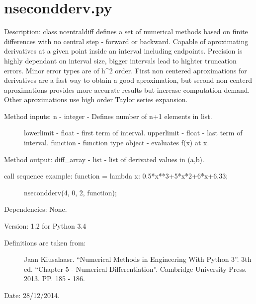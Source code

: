 \documentclass[letterpaper,10pt,oneside]{sphinxmanual}
\theoremstyle{plain}%
\theoremstyle{definition}%
\theoremstyle{remark}%
\begin{document}
\section{nsecondderv.py}
\label{code:module-nsecondderv}\label{code:nsecondderv-py}
Description: class ncentraldiff defines a set of numerical methods based on
finite differences with no central step - forward or backward. Capable of
aproximating derivatives at a given point inside an interval including 
endpoints. Precision is highly dependant on interval size, bigger intervals
lead to highter truncation errors. Minor error types are of h\textasciicircum{}2 order. First
non centered aproximations for derivatives are a fast way to obtain a good
aproximation, but second non centerd aproximations provides more accurate
results but increase computation demand. Other aproximations use high order
Taylor series expansion.
\begin{description}
\item[{Method inputs: n - integer - Defines number of n+1 elements in list.}] \leavevmode
lowerlimit - float - first term of interval.
upperlimit - float - last term of interval.
function - function type object - evaluates f(x) at x.

\end{description}

Method output: diff\_array - list - list of derivated values in (a,b).
\begin{description}
\item[{call sequence example: function = lambda x: 0.5*x**3+5*x*2+6*x+6.33;}] \leavevmode
nsecondderv(4, 0, 2, function);

\end{description}

Dependencies: None.

Version: 1.2 for Python 3.4
\begin{description}
\item[{Definitions are taken from:}] \leavevmode
Jaan Kiusalaasr. ``Numerical Methods in Engineering With Python 3''.
3th ed. ``Chapter 5 - Numerical Differentiation''. 
Cambridge University Press. 2013. PP. 185 - 186.

\end{description}




Date: 28/12/2014.
\end{document}
